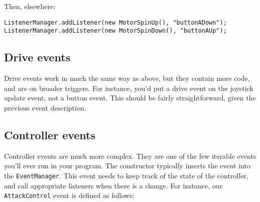 \documentclass[a4paper]{article}
\begin{document}
Then, elsewhere:

\begin{lstlisting}
ListenerManager.addListener(new MotorSpinUp(), "buttonADown");
ListenerManager.addListener(new MotorSpinDown(), "buttonAUp");
\end{lstlisting}

\subsection{Drive events}

Drive events work in much the same way as above, but they contain more code, and are on broader triggers. For instance, you'd put a drive event on the joystick update event, not a button event. This should be fairly straightforward, given the previous event description. 

\subsection{Controller events}

Controller events are much more complex. They are one of the few iterable events you'll ever run in your program. The constructor typically inserts the event into the \lstinline{EventManager}. This event needs to keep track of the state of the controller, and call appropriate listeners when there is a change. For instance, our \lstinline{AttackControl} event is defined as follows:
\end{document}

